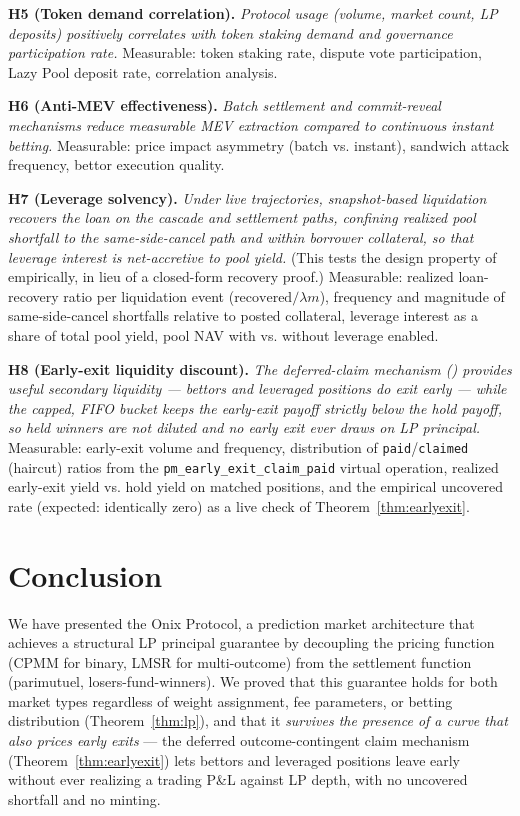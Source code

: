 \documentclass{ledger}
\theoremstyle{plain}
\theoremstyle{remark}
\begin{document}
\textbf{H5 (Token demand correlation).} \emph{Protocol usage (volume, market
count, LP deposits) positively correlates with token staking demand and
governance participation rate.} Measurable: token staking rate, dispute vote
participation, Lazy Pool deposit rate, correlation analysis.

\textbf{H6 (Anti-MEV effectiveness).} \emph{Batch settlement and commit-reveal
mechanisms reduce measurable MEV extraction compared to continuous instant
betting.} Measurable: price impact asymmetry (batch vs. instant), sandwich
attack frequency, bettor execution quality.

\textbf{H7 (Leverage solvency).} \emph{Under live trajectories, snapshot-based
liquidation recovers the loan on the cascade and settlement paths, confining
realized pool shortfall to the same-side-cancel path and within borrower
collateral, so that leverage interest is net-accretive to pool yield.} (This
tests the design property of  empirically, in lieu of a
closed-form recovery proof.) Measurable: realized loan-recovery ratio per
liquidation event ($\text{recovered}/\lambda m$), frequency and magnitude of
same-side-cancel shortfalls relative to posted collateral, leverage interest as a
share of total pool yield, pool NAV with vs. without leverage enabled.

\textbf{H8 (Early-exit liquidity discount).} \emph{The deferred-claim mechanism
() provides useful secondary liquidity --- bettors and
leveraged positions do exit early --- while the capped, FIFO bucket keeps the
early-exit payoff strictly below the hold payoff, so held winners are not
diluted and no early exit ever draws on LP principal.} Measurable: early-exit
volume and frequency, distribution of \texttt{paid}/\texttt{claimed} (haircut)
ratios from the \texttt{pm\_early\_exit\_claim\_paid} virtual operation, realized
early-exit yield vs. hold yield on matched positions, and the empirical
$\text{uncovered}$ rate (expected: identically zero) as a live check of
Theorem~\ref{thm:earlyexit}.

\section{Conclusion}\label{sec:conclusion}

We have presented the Onix Protocol, a prediction market architecture that
achieves a structural LP principal guarantee by decoupling the pricing function
(CPMM for binary, LMSR for multi-outcome) from the settlement function
(parimutuel, losers-fund-winners). We proved that this guarantee holds for both
market types regardless of weight assignment, fee parameters, or betting
distribution (Theorem~\ref{thm:lp}), and that it \emph{survives the presence of a
curve that also prices early exits} --- the deferred outcome-contingent claim
mechanism (Theorem~\ref{thm:earlyexit}) lets bettors and leveraged positions
leave early without ever realizing a trading P\&L against LP depth, with no
uncovered shortfall and no minting.
\end{document}

